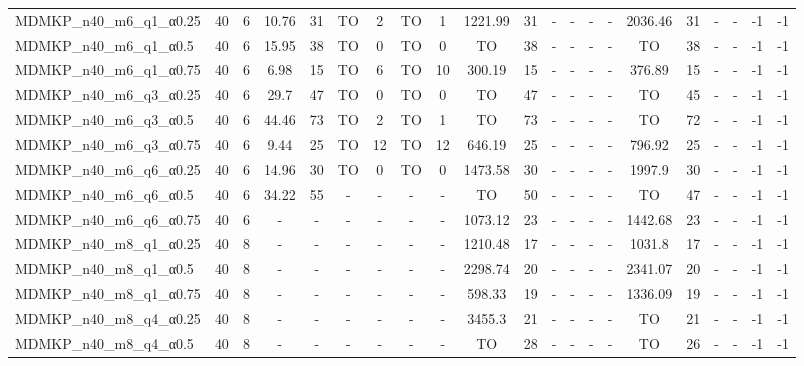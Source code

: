 \begin{sidewaystable}[!ht]
{\begin{tabular}{lcccccccccccccccccccc}
MDMKP\_n40\_m6\_q1\_α0.25 & 40 & 6 &  \textcolor{blue2}{10.76} & 31 & TO & 2 & TO & 1 & 1221.99 & 31 &  - &  - &  - &  - & 2036.46 & 31 &  - &  - & -1 & -1 \\
MDMKP\_n40\_m6\_q1\_α0.5 & 40 & 6 &  \textcolor{blue2}{15.95} & 38 & TO & 0 & TO & 0 & TO & 38 &  - &  - &  - &  - & TO & 38 &  - &  - & -1 & -1 \\
MDMKP\_n40\_m6\_q1\_α0.75 & 40 & 6 &  \textcolor{blue2}{6.98} & 15 & TO & 6 & TO & 10 & 300.19 & 15 &  - &  - &  - &  - & 376.89 & 15 &  - &  - & -1 & -1 \\
MDMKP\_n40\_m6\_q3\_α0.25 & 40 & 6 &  \textcolor{blue2}{29.7} & 47 & TO & 0 & TO & 0 & TO & 47 &  - &  - &  - &  - & TO & 45 &  - &  - & -1 & -1 \\
MDMKP\_n40\_m6\_q3\_α0.5 & 40 & 6 &  \textcolor{blue2}{44.46} & 73 & TO & 2 & TO & 1 & TO & 73 &  - &  - &  - &  - & TO & 72 &  - &  - & -1 & -1 \\
MDMKP\_n40\_m6\_q3\_α0.75 & 40 & 6 &  \textcolor{blue2}{9.44} & 25 & TO & 12 & TO & 12 & 646.19 & 25 &  - &  - &  - &  - & 796.92 & 25 &  - &  - & -1 & -1 \\
MDMKP\_n40\_m6\_q6\_α0.25 & 40 & 6 &  \textcolor{blue2}{14.96} & 30 & TO & 0 & TO & 0 & 1473.58 & 30 &  - &  - &  - &  - & 1997.9 & 30 &  - &  - & -1 & -1 \\
MDMKP\_n40\_m6\_q6\_α0.5 & 40 & 6 &  \textcolor{blue2}{34.22} & 55 &  - &  - &  - &  - & TO & 50 &  - &  - &  - &  - & TO & 47 &  - &  - & -1 & -1 \\
MDMKP\_n40\_m6\_q6\_α0.75 & 40 & 6 &  - &  - &  - &  - &  - &  - &  \textcolor{blue2}{1073.12} & 23 &  - &  - &  - &  - & 1442.68 & 23 &  - &  - & -1 & -1 \\
MDMKP\_n40\_m8\_q1\_α0.25 & 40 & 8 &  - &  - &  - &  - &  - &  - & 1210.48 & 17 &  - &  - &  - &  - &  \textcolor{blue2}{1031.8} & 17 &  - &  - & -1 & -1 \\
MDMKP\_n40\_m8\_q1\_α0.5 & 40 & 8 &  - &  - &  - &  - &  - &  - &  \textcolor{blue2}{2298.74} & 20 &  - &  - &  - &  - & 2341.07 & 20 &  - &  - & -1 & -1 \\
MDMKP\_n40\_m8\_q1\_α0.75 & 40 & 8 &  - &  - &  - &  - &  - &  - &  \textcolor{blue2}{598.33} & 19 &  - &  - &  - &  - & 1336.09 & 19 &  - &  - & -1 & -1 \\
MDMKP\_n40\_m8\_q4\_α0.25 & 40 & 8 &  - &  - &  - &  - &  - &  - &  \textcolor{blue2}{3455.3} & 21 &  - &  - &  - &  - & TO & 21 &  - &  - & -1 & -1 \\
MDMKP\_n40\_m8\_q4\_α0.5 & 40 & 8 &  - &  - &  - &  - &  - &  - & TO & 28 &  - &  - &  - &  - & TO & 26 &  - &  - & -1 & -1 \\

\end{tabular}}
\end{sidewaystable}

